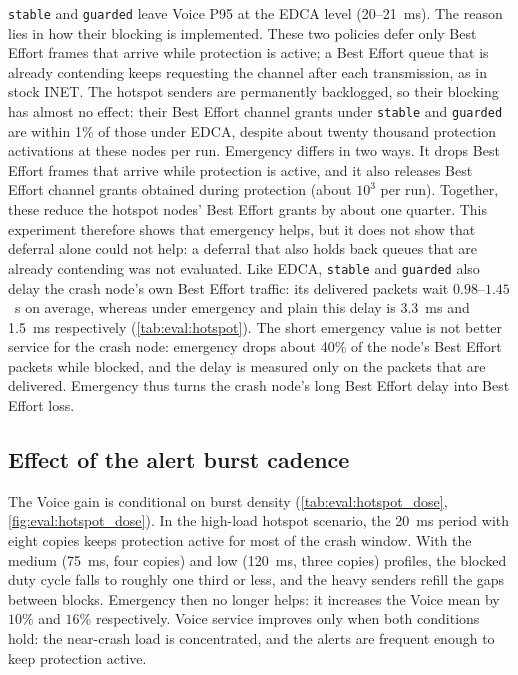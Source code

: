 \texttt{stable} and \texttt{guarded} leave Voice P95 at the EDCA level (20--21~ms).
The reason lies in how their blocking is implemented.
These two policies defer only Best Effort frames that arrive while protection is active; a Best Effort queue that is already contending keeps requesting the channel after each transmission, as in stock INET.
The hotspot senders are permanently backlogged, so their blocking has almost no effect: their Best Effort channel grants under \texttt{stable} and \texttt{guarded} are within 1\% of those under EDCA, despite about twenty thousand protection activations at these nodes per run.
Emergency differs in two ways.
It drops Best Effort frames that arrive while protection is active, and it also releases Best Effort channel grants obtained during protection (about $10^{3}$ per run).
Together, these reduce the hotspot nodes' Best Effort grants by about one quarter.
This experiment therefore shows that emergency helps, but it does not show that deferral alone could not help: a deferral that also holds back queues that are already contending was not evaluated.
Like EDCA, \texttt{stable} and \texttt{guarded} also delay the crash node's own Best Effort traffic: its delivered packets wait $0.98$--$1.45$~\si{\second} on average, whereas under emergency and plain this delay is 3.3~ms and 1.5~ms respectively (\autoref{tab:eval:hotspot}).
The short emergency value is not better service for the crash node: emergency drops about 40\% of the node's Best Effort packets while blocked, and the delay is measured only on the packets that are delivered.
Emergency thus turns the crash node's long Best Effort delay into Best Effort loss.

\subsection{Effect of the alert burst cadence}
\label{sec:eval:hotspot:dose}

The Voice gain is conditional on burst density (\autoref{tab:eval:hotspot_dose}, \autoref{fig:eval:hotspot_dose}).
In the high-load hotspot scenario, the 20~ms period with eight copies keeps protection active for most of the crash window.
With the medium (75~ms, four copies) and low (120~ms, three copies) profiles, the blocked duty cycle falls to roughly one third or less, and the heavy senders refill the gaps between blocks.
Emergency then no longer helps: it increases the Voice mean by $10\%$ and $16\%$ respectively.
Voice service improves only when both conditions hold: the near-crash load is concentrated, and the alerts are frequent enough to keep protection active.

